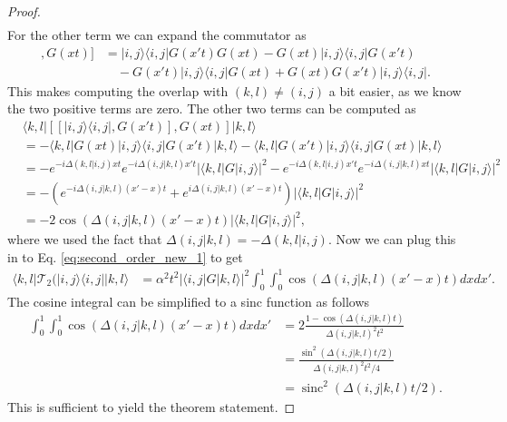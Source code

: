 \documentclass[
 amsmath,amssymb,
 aps,
onecolumn, 
nofootinbib]{revtex4-2}
\newcommand{\ket}[1]{|#1\rangle}
\newcommand{\bra}[1]{\langle #1|}
\newcommand{\ketbra}[2]{| #1\rangle\! \langle #2|}
\newcommand{\abs}[1]{\left| #1 \right|}
\DeclareMathOperator{\sinc}{sinc}
\begin{document}
\begin{proof}
\begin{align}
    \end{align}
    For the other term we can expand the commutator as 
    \begin{align}
        [[\ketbra{i,j}{i,j}, G(x' t)], G(xt)] &= \ketbra{i,j}{i,j} G(x't) G(xt) - G(xt) \ketbra{i,j}{i,j} G(x't) \\
        &\quad- G(x't) \ketbra{i,j}{i,j} G(xt) + G(xt) G(x' t) \ketbra{i,j}{i,j}.
    \end{align}
    This makes computing the overlap with $(k,l) \neq (i,j)$ a bit easier, as we know the two positive terms are zero. The other two terms can be computed as
    \begin{align}
    &\bra{k,l} [[\ketbra{i, j}{i, j}, G(x' t)], G(x t)] \ket{k,l} \\
    &= -\bra{k,l} G(xt) \ket{i,j} \bra{i,j} G(x't) \ket{k,l} - \bra{k,l} G(x't) \ket{i,j} \bra{i,j} G(xt) \ket{k,l} \\
    &= - e^{-i \Delta(k,l | i,j) x t} e^{-i \Delta(i,j | k,l) x' t} \abs{\bra{k,l} G \ket{i,j}}^2 - e^{-i \Delta(k,l | i, j) x' t} e^{-i \Delta(i,j | k,l) x t} \abs{\bra{k,l} G \ket{i,j}}^2 \\
    &= - \left(e^{-i \Delta(i, j| k,l) (x' - x) t} + e^{i \Delta(i,j| k,l) (x' - x) t} \right) \abs{\bra{k,l} G \ket{i,j}}^2 \\
    &= - 2 \cos \left( \Delta(i,j | k, l) (x' - x) t \right) \abs{\bra{k,l} G \ket{i,j}}^2,
    \end{align}
    where we used the fact that $\Delta(i,j |k,l) = - \Delta(k,l| i,j)$. Now we can plug this in to Eq. \eqref{eq:second_order_new_1} to get 
    \begin{align}
        \bra{k,l} \mathcal{T}_2(\ketbra{i,j}{i,j} \ket{k,l} &= \alpha^2 t^2 \abs{\bra{i,j} G \ket{k,l}}^2 \int_0^1 \int_0^1 \cos(\Delta(i,j | k,l) (x' - x) t) dx dx'.
    \end{align}
    The cosine integral can be simplified to a sinc function as follows
    \begin{align}
        \int_0^1 \int_0^1 \cos(\Delta(i,j | k,l) (x' - x) t) dx dx' &= 2\frac{1 - \cos(\Delta(i,j| k,l) t)}{\Delta(i,j| k,l)^2 t^2}  \\
        &= \frac{\sin^2 (\Delta(i,j |k, l) t/2)}{\Delta(i,j | k,l)^2 t^2 /4} \\
        &= \sinc^2(\Delta(i,j | k,l) t/2).
    \end{align}
    This is sufficient to yield the theorem statement.
\end{proof}
\end{document}
